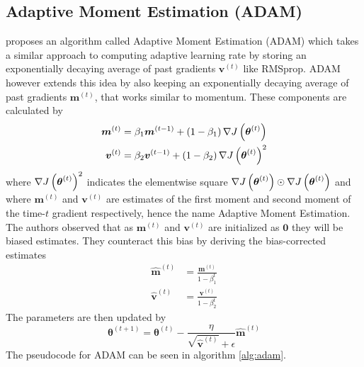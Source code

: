 \subsection{Adaptive Moment Estimation (ADAM)} \label{sec:ADAM}
\cite{Kingma_Ba_2015} proposes an algorithm called Adaptive Moment Estimation (ADAM) which takes a similar approach to computing adaptive learning rate by storing an exponentially decaying average of past gradients $\boldsymbol{v}^{(t)}$ like RMSprop. ADAM however extends this idea by also keeping an exponentially decaying average of past gradients $\boldsymbol{m}^{(t)}$, that works similar to momentum. These components are calculated by 
\begin{equation*}
    \begin{split}
        \boldsymbol{m}^{(t)} &= \beta_1 \boldsymbol{m}^{(t-1)} + \left (1- \beta_1\right)\nabla J \left (\boldsymbol{\theta}^{(t)}\right)\\
        \boldsymbol{v}^{(t)} &= \beta_2 \boldsymbol{v}^{(t-1)} + \left (1 - \beta_2\right)\nabla J \left (\boldsymbol{\theta}^{(t)}\right)^2
    \end{split}
\end{equation*}
where $\nabla J \left (\boldsymbol{\theta}^{(t)}\right)^2$ indicates the elementwise square $\nabla J \left (\boldsymbol{\theta}^{(t)}\right) \odot \nabla J \left (\boldsymbol{\theta}^{(t)}\right)$ and where $\boldsymbol{m}^{(t)}$ and $\boldsymbol{v}^{(t)}$ are estimates of the first moment and second moment of the time-$t$ gradient respectively, hence the name Adaptive Moment Estimation. 
The authors observed that as $\boldsymbol{m}^{(t)}$ and $\boldsymbol{v}^{(t)}$ are initialized as $\boldsymbol{0}$ they will be biased estimates. They counteract this bias by deriving the bias-corrected estimates
\begin{equation*}
    \begin{split}
        \hat{\boldsymbol{m}}^{(t)} &= \frac{\boldsymbol{m}^{(t)}}{1 - \beta_1^t}\\
        \hat{\boldsymbol{v}}^{(t)} &= \frac{\boldsymbol{v}^{(t)}}{1 - \beta_2^t}
    \end{split}
\end{equation*}
The parameters are then updated by 
\begin{equation*}
    \boldsymbol{\theta}^{(t+1)} = \boldsymbol{\theta}^{(t)} - \frac{\eta}{\sqrt{\hat{\boldsymbol{v}}^{(t)}} + \epsilon}\hat{\boldsymbol{m}}^{(t)}
\end{equation*}
The pseudocode for ADAM can be seen in algorithm \ref{alg:adam}.

